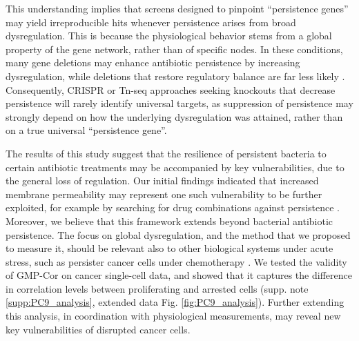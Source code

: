 \documentclass[12pt]{article}
\begin{document}
This understanding implies that screens designed to pinpoint ``persistence genes'' may yield irreproducible hits whenever persistence arises from broad dysregulation. This is because the physiological behavior stems from a global property of the gene network, rather than of specific nodes. In these conditions, many gene deletions may enhance antibiotic persistence by increasing dysregulation, while deletions that restore regulatory balance are far less likely \cite{Blattman2024}. Consequently, CRISPR or Tn-seq approaches seeking knockouts that decrease persistence will rarely identify universal targets, as suppression of persistence may strongly depend on how the underlying dysregulation was attained, rather than on a true universal ``persistence gene''. \par
The results of this study suggest that the resilience of persistent bacteria to certain antibiotic treatments may be accompanied by key vulnerabilities, due to the general loss of regulation. Our initial findings indicated that increased membrane permeability may represent one such vulnerability to be further exploited, for example by searching for drug combinations against persistence \cite{Lázár2022}. Moreover, we believe that this framework extends beyond bacterial antibiotic persistence. The focus on global dysregulation, and the method that we proposed to measure it, should be relevant also to other biological systems under acute stress, such as persister cancer cells under chemotherapy \cite{SHARMA201069, Russo2024,Punzi2025}. We tested the validity of GMP-Cor on cancer single-cell data\cite{Oren2021}, and showed that it captures the difference in correlation levels between proliferating and arrested cells (supp. note \ref{supp:PC9_analysis}, extended data Fig. \ref{fig:PC9_analysis}). Further extending this analysis, in coordination with physiological measurements, may reveal new key vulnerabilities of disrupted cancer cells.

\end{document}
